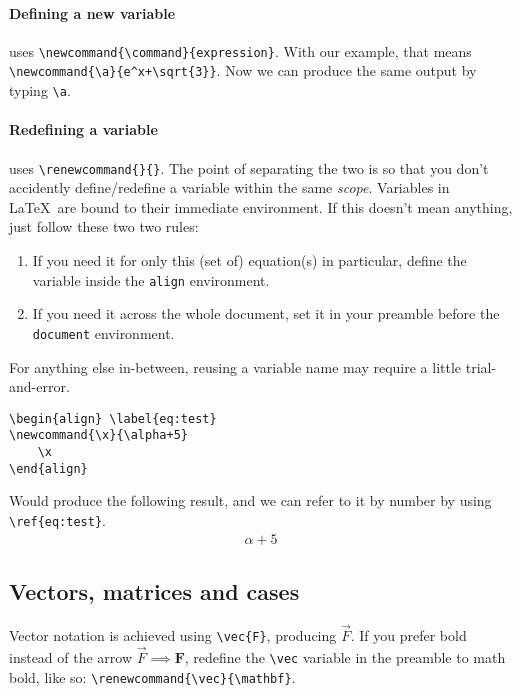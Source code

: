 \paragraph{Defining a new variable} uses \verb|\newcommand{\command}{expression}|.
With our example, that means \verb|\newcommand{\a}{e^x+\sqrt{3}}|.
Now we can produce the same output by typing \verb|\a|.

\paragraph{Redefining a variable} uses \verb|\renewcommand{}{}|. The point of separating the two is so that you don't accidently define/redefine a variable within the same \emph{scope}.
Variables in \LaTeX\ are bound to their immediate environment.
If this doesn't mean anything, just follow these two two rules:
\begin{enumerate}
    \item If you need it for only this (set of) equation(s) in particular, define the variable inside the \verb|align| environment.
    \item If you need it across the whole document, set it in your preamble before the \texttt{document} environment.
\end{enumerate}

For anything else in-between, reusing a variable name may require a little trial-and-error.

\begin{lstlisting}
\begin{align} \label{eq:test}
\newcommand{\x}{\alpha+5}
    \x
\end{align}
\end{lstlisting}
Would produce the following result, and we can refer to it by number by using \verb|\ref{eq:test}|.
\begin{align}
    \alpha+5
\end{align}
\subsection{Vectors, matrices and cases}
Vector notation is achieved using \verb|\vec{F}|, producing \(\vec{F}\).
If you prefer bold instead of the arrow \( \vec{F} \implies \mathbf{F}\), redefine the \verb|\vec| variable in the preamble to math bold, like so:
\verb|\renewcommand{\vec}{\mathbf}|.

